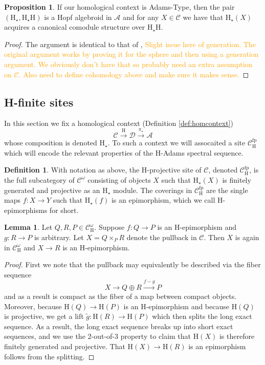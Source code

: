 \documentclass[10pt]{amsart}
\theoremstyle{definition}
\numberwithin{figure}{section}
\numberwithin{equation}{section}
\newtheorem{lemma}[figure]{Lemma}
\newtheorem{proposition}[figure]{Proposition}
\newtheorem{definition}[figure]{Definition}
\newcommand{\cA}{\mathcal{A}}
\newcommand{\cC}{\mathcal{C}}
\newcommand{\cD}{\mathcal{D}}
\theoremstyle{cited}
\newcommand{\fp}{\mathrm{fp}}
\renewcommand{\H}{\mathrm{H}}
\begin{document}
\begin{proposition}
  If our homological context is Adams-Type, then the pair $(\H_\star, \H_\star\H)$ is a Hopf algebroid in $\cA$ and for any $X\in \cC$ we have that $\H_\star(X)$ acquires a canonical comodule structure over $\H_\star \H$.
\end{proposition}

\begin{proof}
  The argument is identical to that of \cite{BB}, \textcolor{orange}{Slight issue here of generation. The original argument works by proving it for the sphere and then using a generation argument. We obviously don't have that so probably need an extra assumption on $\cC$. Also need to define cohomology above and make sure it makes sense.}
\end{proof}

\subsection{H-finite sites}

In this section we fix a homological context (Definition \ref{def:homcontext})
\[
\cC\xrightarrow{\H} \cD \xrightarrow{\pi_\star} \cA
\]
whose composition is denoted $\H_\star$. To such a context we will assocaited a site $\cC_{\H}^\fp$ which will encode the relevant properties of the $\H$-Adams spectral sequence.

\begin{definition}\label{def:projectivesite}
  With notation as above, the $\H$-projective site of $\cC$, denoted $\cC^{\fp}_{\H}$, is the full subcategory of $\cC^\omega$ consisting of objects $X$ such that $\H_{\star}(X)$ is finitely generated and projective as an $\H_\star$ module. The coverings in $\cC^\fp_{\H}$ are the single maps $f:X\to Y$ such that $\H_\star(f)$ is an epimorphism, which we call $\H$-epimorphisms for short.
\end{definition}

\begin{lemma}
  \label{lem:sitepullbacks}
  Let $Q,R,P\in \cC^\omega_\H$. Suppose $f:Q\to P$ is an $\H$-epimorphism and $g:R\to P$ is arbitrary. Let $X=Q\times_P R$ denote the pullback in $\cC$. Then $X$ is again in $\cC^\omega_\H$ and $X\to R$ is an $\H$-epimorphism.
\end{lemma}

\begin{proof}
  First we note that the pullback may equivalently be described via the fiber sequence
  \[
  X\to Q\oplus R \xrightarrow{f-g} P
  \]
  and as a result is compact as the fiber of a map between compact objects. Moreover, because $\H(Q)\to \H(P)$ is an $\H$-epimorphism and because $\H(Q)$ is projective, we get a lift $\tilde g:\H(R)\to \H(P)$ which then splits the long exact sequence. As a result, the long exact sequence breaks up into short exact sequences, and we use the 2-out-of-3 property to claim that $\H(X)$ is therefore finitely generated and projective. That $\H(X)\to \H(R)$ is an epimorphism follows from the splitting.
\end{proof}
\end{document}
